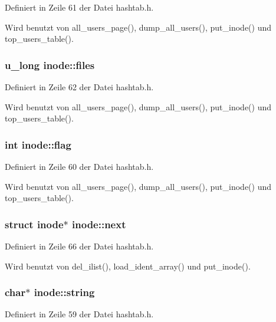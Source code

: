 Definiert in Zeile 61 der Datei hashtab.h.

Wird benutzt von all\_\-users\_\-page(), dump\_\-all\_\-users(), put\_\-inode() und top\_\-users\_\-table().
\subsubsection{\setlength{\rightskip}{0pt plus 5cm}u\_\-long {\bf inode::files}}\label{structinode_16b7ee518b4af2b7cf436840aff1cc8c}




Definiert in Zeile 62 der Datei hashtab.h.

Wird benutzt von all\_\-users\_\-page(), dump\_\-all\_\-users(), put\_\-inode() und top\_\-users\_\-table().
\subsubsection{\setlength{\rightskip}{0pt plus 5cm}int {\bf inode::flag}}\label{structinode_86565f81a8353154619812e7317b1e2d}




Definiert in Zeile 60 der Datei hashtab.h.

Wird benutzt von all\_\-users\_\-page(), dump\_\-all\_\-users(), put\_\-inode() und top\_\-users\_\-table().
\subsubsection{\setlength{\rightskip}{0pt plus 5cm}struct {\bf inode}$\ast$ {\bf inode::next}}\label{structinode_ff3eec0bab3bda5c998d29251bb4d877}




Definiert in Zeile 66 der Datei hashtab.h.

Wird benutzt von del\_\-ilist(), load\_\-ident\_\-array() und put\_\-inode().
\subsubsection{\setlength{\rightskip}{0pt plus 5cm}char$\ast$ {\bf inode::string}}\label{structinode_5883f2056e6f135990b1ba4be0d6017c}




Definiert in Zeile 59 der Datei hashtab.h.

